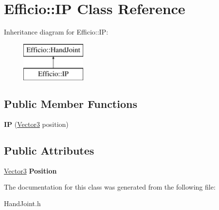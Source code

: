\hypertarget{class_efficio_1_1_i_p}{}\section{Efficio\+:\+:IP Class Reference}
\label{class_efficio_1_1_i_p}
Inheritance diagram for Efficio\+:\+:IP\+:\begin{figure}[H]
\begin{center}
\leavevmode
\includegraphics[height=2.000000cm]{class_efficio_1_1_i_p}
\end{center}
\end{figure}
\subsection*{Public Member Functions}
\begin{DoxyCompactItemize}
\item 
\hypertarget{class_efficio_1_1_i_p_a531c41633c47e34b57b261860b3d0182}{}\label{class_efficio_1_1_i_p_a531c41633c47e34b57b261860b3d0182} 
{\bfseries IP} (\hyperlink{class_efficio_1_1_vector3}{Vector3} position)
\end{DoxyCompactItemize}
\subsection*{Public Attributes}
\begin{DoxyCompactItemize}
\item 
\hypertarget{class_efficio_1_1_i_p_a7475835f031849532d8e31f2d392096a}{}\label{class_efficio_1_1_i_p_a7475835f031849532d8e31f2d392096a} 
\hyperlink{class_efficio_1_1_vector3}{Vector3} {\bfseries Position}
\end{DoxyCompactItemize}


The documentation for this class was generated from the following file\+:\begin{DoxyCompactItemize}
\item 
Hand\+Joint.\+h\end{DoxyCompactItemize}
